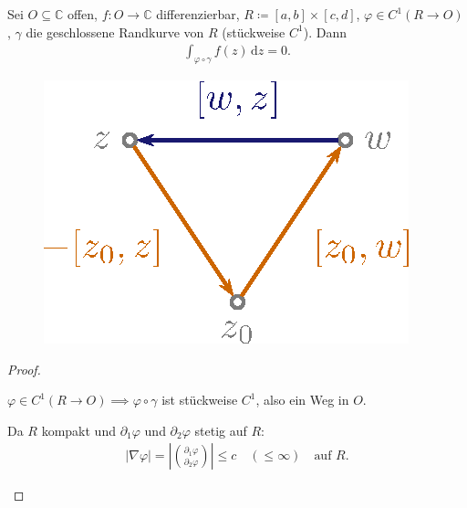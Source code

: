 \documentclass[a4paper,10pt]{scrbook}
\begin{document}
\begin{theorem} \label{thm:2.4}
  Sei $O \subseteq \mathbb{C}$ offen, $f : O \to \mathbb{C}$ differenzierbar, $R \coloneq [a,b] \times [c,d]$, $\varphi \in C^1(R \to O)$, $\gamma$ die geschlossene Randkurve von $R$ (stückweise $C^1$). Dann
  \begin{align*}
    \int_{\varphi \circ \gamma} f(z) \, \mathrm{d}z = 0.
  \end{align*}
  \begin{figure}[H]
    \centering
    \includegraphics[scale=0.2]{images/ana3-tmp-13}
  \end{figure}
  \begin{proof}
    \begin{enum-arab}
      \item $\varphi \in C^1(R \to O) \implies \varphi \circ \gamma$ ist stückweise $C^1$, also ein Weg in $O$.

      \item Da $R$ kompakt und $\partial_1 \varphi$ und $\partial_2 \varphi$ stetig auf $R$:
      \begin{align*}
        |\nabla \varphi| = \left| \binom{\partial_1 \varphi}{\partial_2 \varphi} \right| \leq c \quad (\leq \infty) \quad  \text{auf } R.
      \end{align*}


\end{enum-arab}
\end{proof}
\end{theorem}
\end{document}
